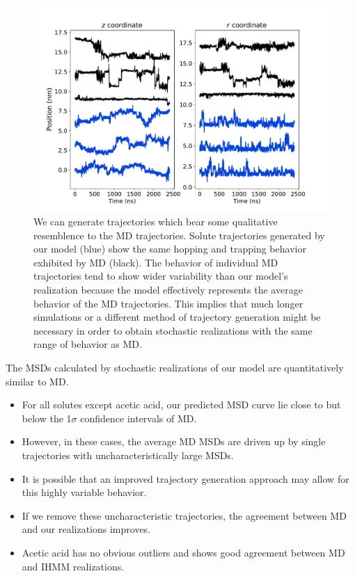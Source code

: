 \documentclass{article}
\begin{document}
  \begin{figure}
  \centering
  \includegraphics[width=\textwidth]{trajectory_realizations_MET.pdf}
  \caption{We can generate trajectories which bear some qualitative resemblence to the MD 
  trajectories. Solute trajectories generated by our model (blue) show the same
  hopping and trapping behavior exhibited by MD (black). The behavior of individual 
  MD trajectories tend to show wider variability than our model's realization because
  the model effectively represents the average behavior of the MD trajectories. This 
  implies that much longer simulations or a different method of trajectory generation might
  be necessary in order to obtain stochastic realizations with the same range of behavior
  as MD.
   }\label{fig:trajectory_realizations_MET}
  \end{figure}
  
  \noindent The MSDs calculated by stochastic realizations of our model are
  quantitatively similar to MD.
  \begin{itemize}
  	\item For all solutes except acetic acid, our predicted MSD curve lie close to
  	but below the 1$\sigma$ confidence intervals of MD.
  	\item However, in these cases, the average MD MSDs are driven up by single trajectories
    with uncharacteristically large MSDs.
    \item It is possible that an improved trajectory generation approach may allow
    for this highly variable behavior.
    \item If we remove these uncharacteristic trajectories, the agreement between 
    MD and our realizations improves. 
    \item Acetic acid has no obvious outliers and shows good agreement between MD and
    IHMM realizations.
  \end{itemize}
  
\end{document}
